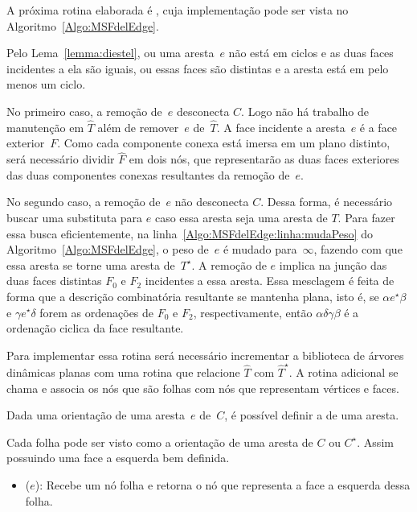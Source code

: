 A próxima rotina elaborada é \MSFdelEdge{}, cuja implementação pode ser vista no Algoritmo~\ref{Algo:MSFdelEdge}.

Pelo Lema~\ref{lemma:diestel}, ou uma aresta~$e$ não está em ciclos e as duas faces incidentes a ela são iguais, ou essas faces são distintas e a aresta está em pelo menos um ciclo.

No primeiro caso, a remoção de~$e$ desconecta $C$.
Logo não há trabalho de manutenção em $\hat T$ além de remover~$e$ de~$\hat T$.
A face incidente a aresta~$e$ é a face exterior~$F$.
Como cada componente conexa está imersa em um plano distinto, será necessário dividir $\hat F$ em dois nós, que representarão as duas faces exteriores das duas componentes conexas resultantes da remoção de~$e$.


No segundo caso, a remoção de~$e$ não desconecta $C$.
Dessa forma, é necessário buscar uma substituta para $e$ caso essa aresta seja uma aresta de $T$.
Para fazer essa busca eficientemente, na linha~\ref{Algo:MSFdelEdge:linha:mudaPeso} do Algoritmo~\ref{Algo:MSFdelEdge}, o peso de~$e$ é mudado para~$\infty$, fazendo com que essa aresta se torne uma aresta de~$T^\star$. 
A remoção de $e$ implica na junção das duas faces distintas $F_0$ e $F_2$ incidentes a essa aresta.
Essa mesclagem é feita de forma que a descrição combinatória resultante se mantenha plana, isto é, se $\alpha e^\star \beta$ e $\gamma e^\star \delta$ forem as ordenações de $F_0$ e $F_2$, respectivamente, então $\alpha \delta\gamma\beta$ é a ordenação ciclica da face resultante.

Para implementar essa rotina será necessário incrementar a biblioteca de árvores dinâmicas planas com uma rotina que relacione $\hat T$ com $\hat T^\star$.
A rotina adicional se chama \LCOLeftFace{} e associa os nós que são folhas com nós que representam vértices e faces.

Dada uma orientação de uma aresta~$e$ de~$C$, é possível definir a  de uma aresta.

Cada folha pode ser visto como a orientação de uma aresta de $C$ ou $C^\star$.
Assim possuindo uma face a esquerda bem definida.

\begin{itemize}
\item \LCOLeftFace($e$): Recebe um nó folha e retorna o nó que representa a face a esquerda dessa folha.
\end{itemize}


